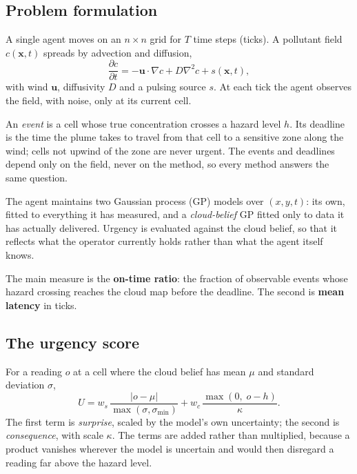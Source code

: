 \documentclass[pdflatex,sn-mathphys-num,iicol]{sn-jnl}
\theoremstyle{thmstyleone}
\theoremstyle{thmstyletwo}
\theoremstyle{thmstylethree}
\begin{document}
\subsection{Problem formulation}

A single agent moves on an $n \times n$ grid for $T$ time steps (ticks). A pollutant field
$c(\mathbf{x}, t)$ spreads by advection and diffusion,
\begin{equation}
\frac{\partial c}{\partial t} = -\mathbf{u}\cdot\nabla c + D\nabla^2 c + s(\mathbf{x},t),
\label{eq:pde}
\end{equation}
with wind $\mathbf{u}$, diffusivity $D$ and a pulsing source $s$. At each tick the agent
observes the field, with noise, only at its current cell.

An \emph{event} is a cell whose true concentration crosses a hazard level $h$. Its
deadline is the time the plume takes to travel from that cell to a sensitive zone along
the wind; cells not upwind of the zone are never urgent. The events and deadlines depend
only on the field, never on the method, so every method answers the same question.

The agent maintains two Gaussian process (GP) models over $(x, y, t)$: its own, fitted to
everything it has measured, and a \emph{cloud-belief} GP fitted only to data it has
actually delivered. Urgency is evaluated against the cloud belief, so that it reflects what the
operator currently holds rather than what the agent itself knows.

The main measure is the \textbf{on-time ratio}: the fraction of observable events whose
hazard crossing reaches the cloud map before the deadline. The second is \textbf{mean
latency} in ticks.

\subsection{The urgency score}

For a reading $o$ at a cell where the cloud belief has mean $\mu$ and standard deviation
$\sigma$,
\begin{equation}
U = w_s\,\frac{|o - \mu|}{\max(\sigma, \sigma_{\min})}
  + w_c\,\frac{\max(0,\; o - h)}{\kappa}.
\label{eq:urgency}
\end{equation}
The first term is \emph{surprise}, scaled by the model's own uncertainty; the second is
\emph{consequence}, with scale $\kappa$. The terms are added rather than multiplied,
because a product vanishes wherever the model is uncertain and would then disregard a
reading far above the hazard level.
\end{document}
